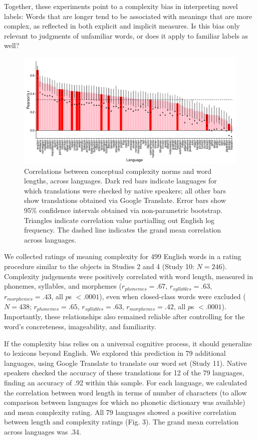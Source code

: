\documentclass[12pt]{article}
\begin{document}
Together, these experiments point to a complexity bias in interpreting novel labels: Words that are longer tend to be associated with meanings that are more complex, as reflected in both explicit and implicit measures. Is this bias only relevant to judgments of unfamiliar words, or does it apply to familiar labels as well? 

\begin{figure}[ht!]
\begin{center}
\includegraphics[scale = .53]{figs/FIG_3.pdf}
\caption{Correlations between conceptual complexity norms and word lengths, across languages. Dark red bars indicate languages for which translations were checked by native speakers; all other bars show translations obtained via Google Translate. Error bars show 95\% confidence intervals obtained via non-parametric bootstrap. Triangles indicate correlation value partialling out English log frequency. The dashed line indicates the grand mean correlation across languages.} 
\end{center}
\label{fig:real_objs}
\end{figure}

We collected ratings of meaning complexity for 499 English words  in a rating procedure similar to the objects in Studies 2 and 4 (Study 10: $N = 246$). Complexity judgements were positively correlated with word length, measured in phonemes, syllables, and morphemes ($r_{phonemes} = .67$, $r_{syllables} = .63$, $r_{morphemes} = .43$, all $p$s $< .0001$), even when closed-class words were excluded ($N = 438$; $r_{phonemes} = .65$, $r_{syllables} = .63$, $r_{morphemes} = .42$, all $p$s $< .0001$). Importantly, these relationships also remained reliable after controlling for the word's concreteness, imageability, and familiarity. 
						
If the complexity bias relies on a universal cognitive process, it should generalize to lexicons beyond English. We explored this prediction in 79 additional languages, using Google Translate to translate our word set (Study 11). Native speakers checked the accuracy of these translations for 12 of the 79 languages, finding an accuracy of .92 within this sample. For each language, we calculated the correlation between word length in terms of number of characters (to allow comparison between languages for which no phonetic dictionary was available) and mean complexity rating. All 79 languages showed a positive correlation between length and complexity ratings (Fig. 3). The grand mean correlation across languages was .34. 
					
\end{document}
